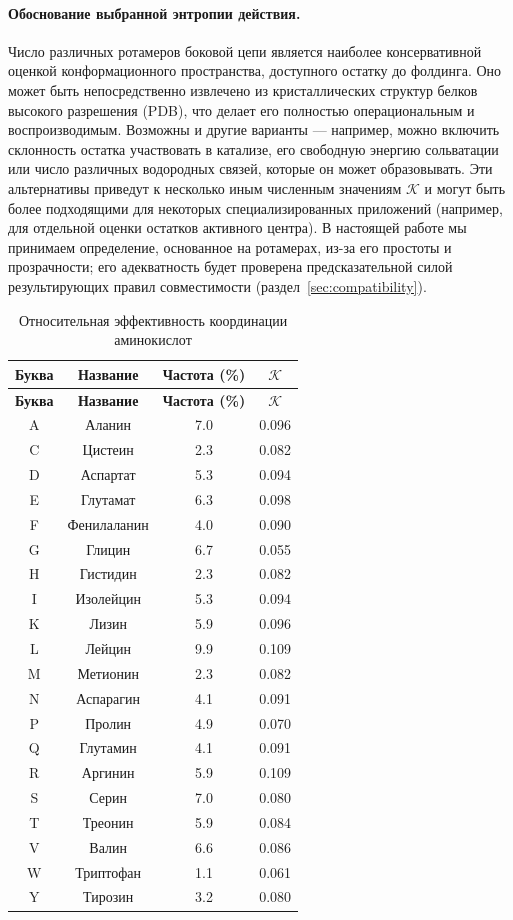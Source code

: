 \documentclass[12pt,a4paper]{article}
\newcommand{\REL}{\mathcal{K}}          %
\begin{document}
	\paragraph{Обоснование выбранной энтропии действия.}
	Число различных ротамеров боковой цепи является наиболее консервативной оценкой конформационного пространства, доступного остатку до фолдинга.
	Оно может быть непосредственно извлечено из кристаллических структур белков высокого разрешения (PDB), что делает его полностью операциональным и воспроизводимым.
	Возможны и другие варианты — например, можно включить склонность остатка участвовать в катализе, его свободную энергию сольватации или число различных водородных связей, которые он может образовывать.
	Эти альтернативы приведут к несколько иным численным значениям \(\REL\) и могут быть более подходящими для некоторых специализированных приложений (например, для отдельной оценки остатков активного центра).
	В настоящей работе мы принимаем определение, основанное на ротамерах, из-за его простоты и прозрачности; его адекватность будет проверена предсказательной силой результирующих правил совместимости (раздел~\ref{sec:compatibility}).
	
	\begin{longtable}{|c|c|c|c|}
		\caption{Относительная эффективность координации аминокислот}\label{tab:amino}\\
		\hline
		\textbf{Буква} & \textbf{Название} & \textbf{Частота (\%)} & \(\REL\) \\
		\hline
		\endfirsthead
		\hline
		\textbf{Буква} & \textbf{Название} & \textbf{Частота (\%)} & \(\REL\) \\
		\hline
		\endhead
		\hline
		A & Аланин & 7.0 & 0.096 \\
		C & Цистеин & 2.3 & 0.082 \\
		D & Аспартат & 5.3 & 0.094 \\
		E & Глутамат & 6.3 & 0.098 \\
		F & Фенилаланин & 4.0 & 0.090 \\
		G & Глицин & 6.7 & 0.055 \\
		H & Гистидин & 2.3 & 0.082 \\
		I & Изолейцин & 5.3 & 0.094 \\
		K & Лизин & 5.9 & 0.096 \\
		L & Лейцин & 9.9 & 0.109 \\
		M & Метионин & 2.3 & 0.082 \\
		N & Аспарагин & 4.1 & 0.091 \\
		P & Пролин & 4.9 & 0.070 \\
		Q & Глутамин & 4.1 & 0.091 \\
		R & Аргинин & 5.9 & 0.109 \\
		S & Серин & 7.0 & 0.080 \\
		T & Треонин & 5.9 & 0.084 \\
		V & Валин & 6.6 & 0.086 \\
		W & Триптофан & 1.1 & 0.061 \\
		Y & Тирозин & 3.2 & 0.080 \\
		\hline
	\end{longtable}
	
\end{document}
